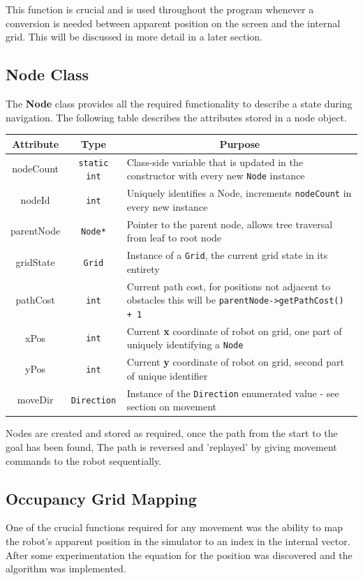 \documentclass[a4paper,12pt]{article}
\begin{document}
This function is crucial and is used throughout the program whenever a conversion is needed between apparent position on the screen and the internal grid. This will be discussed in more detail in a later section.
\subsection{Node Class}
The \textbf{Node} class provides all the required functionality to describe a state during navigation. The following table describes the attributes stored in a node object.
\begin{table}[h!]
\scriptsize
\begin{tabular}{|c|c|l|}
    \hline
    \multicolumn{1}{|c|}{\textbf{Attribute}} & \multicolumn{1}{c|}{\textbf{Type}} & \multicolumn{1}{c|}{\textbf{Purpose}} \\
    \hline
    nodeCount & \texttt{static int} & Class-side variable that is updated in the constructor with every new \texttt{Node} instance\\
    \hline
    nodeId & \texttt{int} & Uniquely identifies a Node, increments \texttt{nodeCount} in every new instance\\
    \hline
    parentNode & \texttt{Node*} & Pointer to the parent node, allows tree traversal from leaf to root node \\
    \hline
    gridState & \texttt{Grid} & Instance of a \texttt{Grid},  the current grid state in its entirety\\
    \hline
    pathCost & \texttt{int} & Current path cost, for positions not adjacent to obstacles this will be \texttt{parentNode->getPathCost() + 1} \\
    \hline
    xPos & \texttt{int} & Current \textbf{x} coordinate of robot on grid, one part of uniquely identifying a \texttt{Node} \\
    \hline
    yPos & \texttt{int} & Current \textbf{y} coordinate of robot on grid, second part of unique identifier\\
    \hline
    moveDir & \texttt{Direction} & Instance of the \texttt{Direction} enumerated value - see section on movement\\
    \hline
\end{tabular}
\normalsize
\end{table}

Nodes are created and stored as required, once the path from the start to the goal has been found, The path is reversed and 'replayed' by giving movement commands to the robot sequentially.
\subsection{Occupancy Grid Mapping}
One of the crucial functions required for any movement was the ability to map the robot's apparent position in the simulator to an index in the internal vector. After some experimentation the equation for the position was discovered and the algorithm was implemented. 
\end{document}
